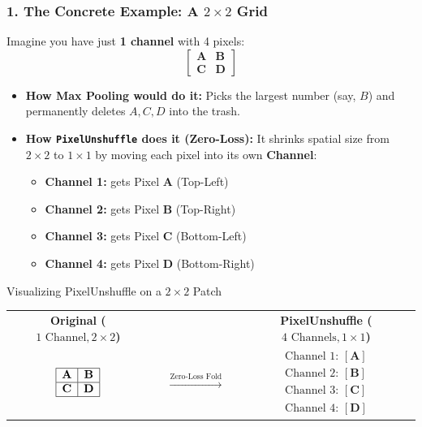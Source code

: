 \documentclass[11pt,a4paper]{article}
\begin{document}
\subsubsection*{1. The Concrete Example: A $2 \times 2$ Grid}
Imagine you have just \textbf{1 channel} with 4 pixels:
$$\begin{bmatrix} \mathbf{A} & \mathbf{B} \\ \mathbf{C} & \mathbf{D} \end{bmatrix}$$
\begin{itemize}[leftmargin=1.5em]
    \item \textbf{How Max Pooling would do it:} Picks the largest number (say, $B$) and permanently deletes $A, C, D$ into the trash.
    \item \textbf{How \texttt{PixelUnshuffle} does it (Zero-Loss):} It shrinks spatial size from $2\times 2$ to $1\times 1$ by moving each pixel into its own \textbf{Channel}:
    \begin{itemize}
        \item \textbf{Channel 1:} gets Pixel $\mathbf{A}$ (Top-Left)
        \item \textbf{Channel 2:} gets Pixel $\mathbf{B}$ (Top-Right)
        \item \textbf{Channel 3:} gets Pixel $\mathbf{C}$ (Bottom-Left)
        \item \textbf{Channel 4:} gets Pixel $\mathbf{D}$ (Bottom-Right)
    \end{itemize}
\end{itemize}

\begin{diagrambox}{Visualizing PixelUnshuffle on a $2\times 2$ Patch}
\begin{center}
\begin{tabular}{ccc}
\textbf{Original ($1\text{ Channel}, 2\times 2$)} & & \textbf{PixelUnshuffle ($4\text{ Channels}, 1\times 1$)} \\[0.4em]
$\begin{array}{|c|c|}
\hline
\mathbf{A} & \mathbf{B} \\
\hline
\mathbf{C} & \mathbf{D} \\
\hline
\end{array}$
& $\quad \xrightarrow{\text{Zero-Loss Fold}} \quad$ &
$\begin{array}{l}
\text{Channel 1: } [\mathbf{A}] \\
\text{Channel 2: } [\mathbf{B}] \\
\text{Channel 3: } [\mathbf{C}] \\
\text{Channel 4: } [\mathbf{D}]
\end{array}$
\end{tabular}
\end{center}
\end{diagrambox}
\end{document}
